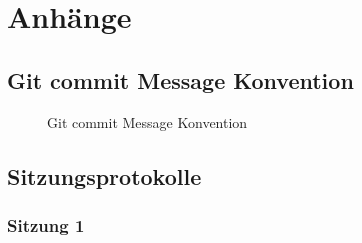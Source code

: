 \chapter{Anhänge}

\section{Git commit Message Konvention}
\label{sec:gitconv}
\begin{figure}[h]
    \centering
    \caption{Git commit Message Konvention}
\end{figure}

\section{Sitzungsprotokolle}
\subsection{Sitzung 1}

